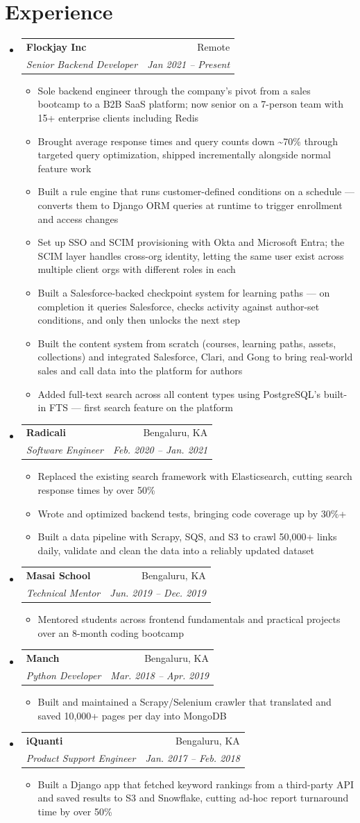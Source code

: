\documentclass[letterpaper,11pt]{article}
\makeatletter
\newcommand{\resumeItem}[1]{\item\small{#1 \vspace{-2pt}}}
\newcommand{\resumeSubheading}[4]{\vspace{-2pt}\item\begin{tabular*}{0.97\textwidth}[t]{l@{\extracolsep{\fill}}r}\textbf{#1} & #2 \\\textit{\small#3} & \textit{\small #4} \\\end{tabular*}\vspace{-7pt}}
\newcommand{\resumeSubHeadingListStart}{\begin{itemize}[leftmargin=0.15in, label={}]}
\newcommand{\resumeSubHeadingListEnd}{\end{itemize}}
\newcommand{\resumeItemListStart}{\begin{itemize}}
\newcommand{\resumeItemListEnd}{\end{itemize}\vspace{-5pt}}
\makeatother
\begin{document}
\section{Experience}
  \resumeSubHeadingListStart
    \resumeSubheading
      {Flockjay Inc}{Remote}
      {Senior Backend Developer}{Jan 2021 -- Present}
      \resumeItemListStart
        \resumeItem{Sole backend engineer through the company's pivot from a sales bootcamp to a B2B SaaS platform; now senior on a 7-person team with 15+ enterprise clients including Redis}
        \resumeItem{Brought average response times and query counts down \textasciitilde70\% through targeted query optimization, shipped incrementally alongside normal feature work}
        \resumeItem{Built a rule engine that runs customer-defined conditions on a schedule --- converts them to Django ORM queries at runtime to trigger enrollment and access changes}
        \resumeItem{Set up SSO and SCIM provisioning with Okta and Microsoft Entra; the SCIM layer handles cross-org identity, letting the same user exist across multiple client orgs with different roles in each}
        \resumeItem{Built a Salesforce-backed checkpoint system for learning paths --- on completion it queries Salesforce, checks activity against author-set conditions, and only then unlocks the next step}
        \resumeItem{Built the content system from scratch (courses, learning paths, assets, collections) and integrated Salesforce, Clari, and Gong to bring real-world sales and call data into the platform for authors}
        \resumeItem{Added full-text search across all content types using PostgreSQL's built-in FTS --- first search feature on the platform}
      \resumeItemListEnd
    \resumeSubheading
      {Radicali}{Bengaluru, KA}
      {Software Engineer}{Feb. 2020 -- Jan. 2021}
      \resumeItemListStart
        \resumeItem{Replaced the existing search framework with Elasticsearch, cutting search response times by over 50\%}
        \resumeItem{Wrote and optimized backend tests, bringing code coverage up by 30\%+}
        \resumeItem{Built a data pipeline with Scrapy, SQS, and S3 to crawl 50,000+ links daily, validate and clean the data into a reliably updated dataset}
      \resumeItemListEnd
    \resumeSubheading
      {Masai School}{Bengaluru, KA}
      {Technical Mentor}{Jun. 2019 -- Dec. 2019}
      \resumeItemListStart
        \resumeItem{Mentored students across frontend fundamentals and practical projects over an 8-month coding bootcamp}
      \resumeItemListEnd
    \resumeSubheading
      {Manch}{Bengaluru, KA}
      {Python Developer}{Mar. 2018 -- Apr. 2019}
      \resumeItemListStart
        \resumeItem{Built and maintained a Scrapy/Selenium crawler that translated and saved 10,000+ pages per day into MongoDB}
      \resumeItemListEnd
    \resumeSubheading
      {iQuanti}{Bengaluru, KA}
      {Product Support Engineer}{Jan. 2017 -- Feb. 2018}
      \resumeItemListStart
        \resumeItem{Built a Django app that fetched keyword rankings from a third-party API and saved results to S3 and Snowflake, cutting ad-hoc report turnaround time by over 50\%}
      \resumeItemListEnd
  \resumeSubHeadingListEnd
\end{document}
